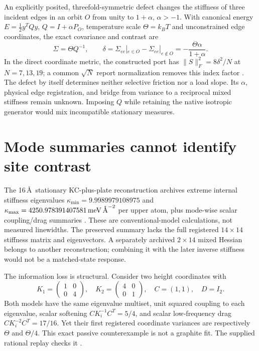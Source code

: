 \documentclass[9pt,a4paper,twocolumn]{extarticle}
\begin{document}
An explicitly posited, threefold-symmetric defect changes the stiffness of three incident edges in an orbit $O$ from unity to $1+\alpha$, $\alpha>-1$. With canonical energy $E=\tfrac12 y^TQy$, $Q=I+\alpha P_O$, temperature scale $\Theta=k_BT$ and unconstrained edge coordinates, the exact covariance and contrast are
\begin{equation}
 \Sigma=\Theta Q^{-1},\qquad
 \delta=\Sigma_{ee}|_{e\in O}-\Sigma_{ee}|_{e\notin O}
 =-\frac{\Theta\alpha}{1+\alpha}.\label{eq:variance}
\end{equation}
In the direct coordinate metric, the constructed port has $\|S\|_F^2=8\delta^2/N$ at $N=7,13,19$; a common $\sqrt N$ report normalization removes this index factor \cite{udphysics}. The defect by itself determines neither selective friction nor a load slope. Its $\alpha$, physical edge registration, and bridge from variance to a reciprocal mixed stiffness remain unknown. Imposing $Q$ while retaining the native isotropic generator would mix incompatible stationary measures.

\section{Mode summaries cannot identify site contrast}
The 16\,\AA\ stationary KC-plus-plate reconstruction archives extreme internal stiffness eigenvalues $\kappa_{\min}=9.9989979108975$ and $\kappa_{\max}=4250.978391407581\,{\rm meV}\,\text{\AA}^{-2}$ per upper atom, plus mode-wise scalar coupling/drag summaries \cite{udphysics}. These are conventional-model calculations, not measured linewidths. The preserved summary lacks the full registered $14\times14$ stiffness matrix and eigenvectors. A separately archived $2\times14$ mixed Hessian belongs to another reconstruction; combining it with the later inverse stiffness would not be a matched-state response.

The information loss is structural. Consider two height coordinates with
\begin{equation}
 K_1=\begin{pmatrix}1&0\\0&4\end{pmatrix},\quad
 K_2=\begin{pmatrix}4&0\\0&1\end{pmatrix},\quad
 C=(1,1),\quad D=I_2.\label{eq:counter}
\end{equation}
Both models have the same eigenvalue multiset, unit squared coupling to each eigenvalue, scalar softening $CK_i^{-1}C^T=5/4$, and scalar low-frequency drag $CK_i^{-2}C^T=17/16$. Yet their first registered coordinate variances are respectively $\Theta$ and $\Theta/4$. This exact passive counterexample is not a graphite fit. The supplied rational replay checks it \cite{udphysics}.
\end{document}
